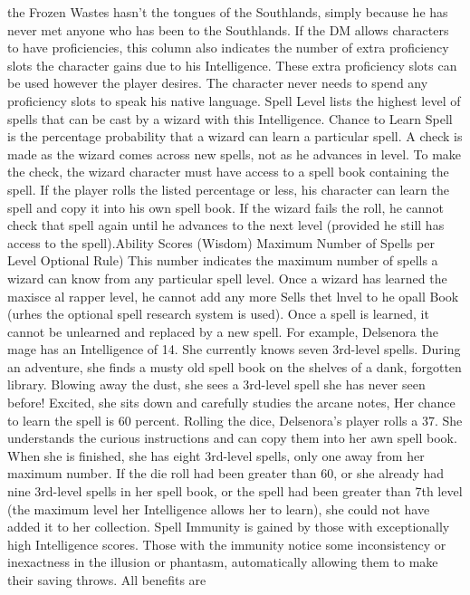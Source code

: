 \documentclass[../main.tex]{subfiles}
\begin{document}
\begin{multicols}{3}
the Frozen Wastes hasn't the tongues of the
Southlands, simply because he has never
met anyone who has been to the Southlands.
If the DM allows characters to have proficiencies, this column also indicates the
number of extra proficiency slots the
character gains due to his Intelligence.
These extra proficiency slots can be used
however the player desires. The character never needs to spend any proficiency
slots to speak his native language.
Spell Level lists the highest level of spells
that can be cast by a wizard with this Intelligence.
Chance to Learn Spell is the percentage
probability that a wizard can learn a particular spell. A check is made as the wizard comes
across new spells, not as he advances in level.
To make the check, the wizard character must
have access to a spell book containing the
spell. If the player rolls the listed percentage or
less, his character can learn the spell and copy
it into his own spell book. If the wizard fails
the roll, he cannot check that spell again until
he advances to the next level (provided he still
has access to the spell).Ability Scores (Wisdom)
Maximum Number of
Spells per Level
Optional Rule)
This number indicates the maximum number of spells a wizard can know from any particular spell
level. Once a wizard has learned the maxisce al rapper
level, he cannot add any more
Sells thet lnvel to he opall Book (urhes
the optional spell research system is used).
Once a spell is learned, it cannot be unlearned and replaced by a new spell.
For example, Delsenora the mage has an
Intelligence of 14. She currently knows
seven 3rd-level spells. During an adventure, she finds a musty old spell book on
the shelves of a dank, forgotten library.
Blowing away the dust, she sees a 3rd-level
spell she has never seen before! Excited,
she sits down and carefully studies the arcane notes, Her chance to learn the spell is
60 percent. Rolling the dice, Delsenora’s
player rolls a 37. She understands the curious instructions and can copy them into
her awn spell book. When she is finished,
she has eight 3rd-level spells, only one
away from her maximum number. If the
die roll had been greater than 60, or she already had nine 3rd-level spells in her spell
book, or the spell had been greater than
7th level (the maximum level her Intelligence allows her to learn), she could not
have added it to her collection.
Spell Immunity is gained by those with
exceptionally high Intelligence scores.
Those with the immunity notice some inconsistency or inexactness in the illusion or
phantasm, automatically allowing them to
make their saving throws. All benefits are

\end{multicols}
\end{document}
